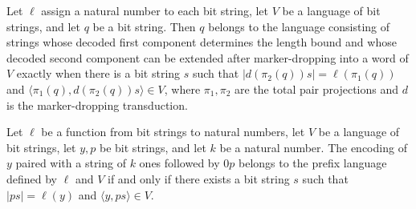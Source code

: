 \begin{theorem}
\label{Complexity.KarpLipton.mem_prefixLangOf}
\leanok
{}
Let $\ell$ assign a natural number to each bit string, let $V$ be a language of bit
strings, and let $q$ be a bit string. Then $q$ belongs to the language consisting of
strings whose decoded first component determines the length bound and whose decoded
second component can be extended after marker-dropping into a word of $V$ exactly when
there is a bit string $s$ such that $\lvert d(\pi_2(q))s\rvert=\ell(\pi_1(q))$ and
$\langle\pi_1(q),d(\pi_2(q))s\rangle\in V$, where $\pi_1,\pi_2$ are the total pair
projections and $d$ is the marker-dropping transduction.
\end{theorem}

\begin{theorem}
\label{Complexity.KarpLipton.mem_prefixLangOf_iff}
\leanok
{}
Let $\ell$ be a function from bit strings to natural numbers, let $V$ be a language of
bit strings, let $y,p$ be bit strings, and let $k$ be a natural number. The encoding of
$y$ paired with a string of $k$ ones followed by $0p$ belongs to the prefix language
defined by $\ell$ and $V$ if and only if there exists a bit string $s$ such that $\lvert
ps\rvert=\ell(y)$ and $\langle y,ps\rangle\in V$.
\end{theorem}

